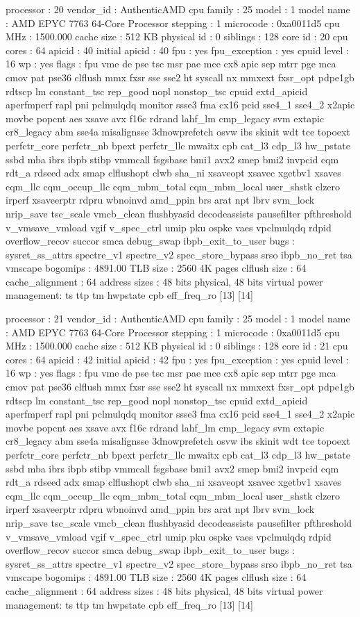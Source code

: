 processor	: 20
vendor_id	: AuthenticAMD
cpu family	: 25
model		: 1
model name	: AMD EPYC 7763 64-Core Processor
stepping	: 1
microcode	: 0xa0011d5
cpu MHz		: 1500.000
cache size	: 512 KB
physical id	: 0
siblings	: 128
core id		: 20
cpu cores	: 64
apicid		: 40
initial apicid	: 40
fpu		: yes
fpu_exception	: yes
cpuid level	: 16
wp		: yes
flags		: fpu vme de pse tsc msr pae mce cx8 apic sep mtrr pge mca cmov pat pse36 clflush mmx fxsr sse sse2 ht syscall nx mmxext fxsr_opt pdpe1gb rdtscp lm constant_tsc rep_good nopl nonstop_tsc cpuid extd_apicid aperfmperf rapl pni pclmulqdq monitor ssse3 fma cx16 pcid sse4_1 sse4_2 x2apic movbe popcnt aes xsave avx f16c rdrand lahf_lm cmp_legacy svm extapic cr8_legacy abm sse4a misalignsse 3dnowprefetch osvw ibs skinit wdt tce topoext perfctr_core perfctr_nb bpext perfctr_llc mwaitx cpb cat_l3 cdp_l3 hw_pstate ssbd mba ibrs ibpb stibp vmmcall fsgsbase bmi1 avx2 smep bmi2 invpcid cqm rdt_a rdseed adx smap clflushopt clwb sha_ni xsaveopt xsavec xgetbv1 xsaves cqm_llc cqm_occup_llc cqm_mbm_total cqm_mbm_local user_shstk clzero irperf xsaveerptr rdpru wbnoinvd amd_ppin brs arat npt lbrv svm_lock nrip_save tsc_scale vmcb_clean flushbyasid decodeassists pausefilter pfthreshold v_vmsave_vmload vgif v_spec_ctrl umip pku ospke vaes vpclmulqdq rdpid overflow_recov succor smca debug_swap ibpb_exit_to_user
bugs		: sysret_ss_attrs spectre_v1 spectre_v2 spec_store_bypass srso ibpb_no_ret tsa vmscape
bogomips	: 4891.00
TLB size	: 2560 4K pages
clflush size	: 64
cache_alignment	: 64
address sizes	: 48 bits physical, 48 bits virtual
power management: ts ttp tm hwpstate cpb eff_freq_ro [13] [14]

processor	: 21
vendor_id	: AuthenticAMD
cpu family	: 25
model		: 1
model name	: AMD EPYC 7763 64-Core Processor
stepping	: 1
microcode	: 0xa0011d5
cpu MHz		: 1500.000
cache size	: 512 KB
physical id	: 0
siblings	: 128
core id		: 21
cpu cores	: 64
apicid		: 42
initial apicid	: 42
fpu		: yes
fpu_exception	: yes
cpuid level	: 16
wp		: yes
flags		: fpu vme de pse tsc msr pae mce cx8 apic sep mtrr pge mca cmov pat pse36 clflush mmx fxsr sse sse2 ht syscall nx mmxext fxsr_opt pdpe1gb rdtscp lm constant_tsc rep_good nopl nonstop_tsc cpuid extd_apicid aperfmperf rapl pni pclmulqdq monitor ssse3 fma cx16 pcid sse4_1 sse4_2 x2apic movbe popcnt aes xsave avx f16c rdrand lahf_lm cmp_legacy svm extapic cr8_legacy abm sse4a misalignsse 3dnowprefetch osvw ibs skinit wdt tce topoext perfctr_core perfctr_nb bpext perfctr_llc mwaitx cpb cat_l3 cdp_l3 hw_pstate ssbd mba ibrs ibpb stibp vmmcall fsgsbase bmi1 avx2 smep bmi2 invpcid cqm rdt_a rdseed adx smap clflushopt clwb sha_ni xsaveopt xsavec xgetbv1 xsaves cqm_llc cqm_occup_llc cqm_mbm_total cqm_mbm_local user_shstk clzero irperf xsaveerptr rdpru wbnoinvd amd_ppin brs arat npt lbrv svm_lock nrip_save tsc_scale vmcb_clean flushbyasid decodeassists pausefilter pfthreshold v_vmsave_vmload vgif v_spec_ctrl umip pku ospke vaes vpclmulqdq rdpid overflow_recov succor smca debug_swap ibpb_exit_to_user
bugs		: sysret_ss_attrs spectre_v1 spectre_v2 spec_store_bypass srso ibpb_no_ret tsa vmscape
bogomips	: 4891.00
TLB size	: 2560 4K pages
clflush size	: 64
cache_alignment	: 64
address sizes	: 48 bits physical, 48 bits virtual
power management: ts ttp tm hwpstate cpb eff_freq_ro [13] [14]

